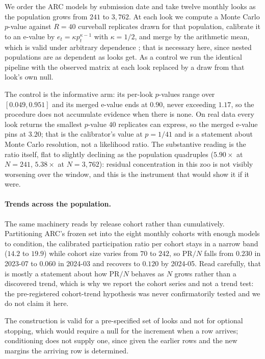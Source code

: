 \documentclass{article}
\begin{document}
We order the ARC models by submission date and take twelve monthly looks as the population grows
from $241$ to $3{,}762$. At each look we compute a Monte Carlo $p$-value against $R=40$ curveball
replicates drawn for that population, calibrate it to an e-value by $e_t=\kappa p_t^{\kappa-1}$ with
$\kappa=1/2$, and merge by the arithmetic mean, which is valid under arbitrary dependence
\citep{vovkwang2021}; that is necessary here, since nested populations are as dependent as looks get. As
a control we run the identical pipeline with the observed matrix at each look replaced by a draw
from that look's own null.

The control is the informative arm: its per-look $p$-values range over $[0.049, 0.951]$ and its
merged e-value ends at $0.90$, never exceeding $1.17$, so the procedure does not accumulate evidence
when there is none. On real data every look returns the smallest $p$-value $40$ replicates can
express, so the merged e-value pins at $3.20$; that is the calibrator's value at $p=1/41$ and is a
statement about Monte Carlo resolution, not a likelihood ratio. The substantive reading is the ratio
itself, flat to slightly declining as the population quadruples ($5.90\times$ at $N=241$,
$5.38\times$ at $N=3{,}762$): residual concentration in this zoo is not visibly worsening over the
window, and this is the instrument that would show it if it were. \paragraph{Trends across the population.} The same machinery reads by release cohort rather than
cumulatively. Partitioning ARC's frozen set into the eight monthly cohorts with enough models to
condition, the calibrated participation ratio per cohort stays in a narrow band ($14.2$ to $19.9$)
while cohort size varies from $70$ to $242$, so $\mathrm{PR}/N$ falls from $0.230$ in 2023-07 to
$0.060$ in 2024-03 and recovers to $0.120$ by 2024-05. Read carefully, that is mostly a statement
about how $\mathrm{PR}/N$ behaves as $N$ grows rather than a discovered trend, which is why we
report the cohort series and not a trend test: the pre-registered cohort-trend hypothesis was never
confirmatorily tested and we do not claim it here.

The construction is valid for a
pre-specified set of looks and not for optional stopping, which would require a null for the
increment when a row arrives; conditioning does not supply one, since given the earlier rows and the
new margins the arriving row is determined.
\end{document}
